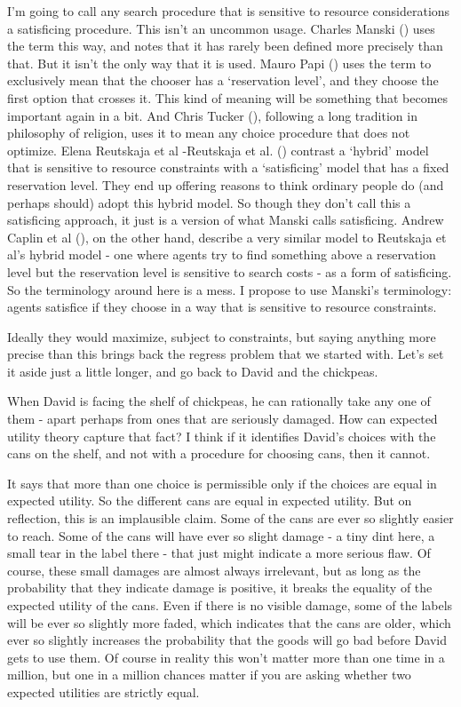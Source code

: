 \documentclass[
  10pt,
  letterpaper,
  DIV=11,
  numbers=noendperiod,
  twoside]{scrartcl}
\begin{document}
I'm going to call any search procedure that is sensitive to resource
considerations a satisficing procedure. This isn't an uncommon usage.
Charles Manski () uses the term this way,
and notes that it has rarely been defined more precisely than that. But
it isn't the only way that it is used. Mauro Papi
() uses the term to exclusively mean that
the chooser has a `reservation level', and they choose the first option
that crosses it. This kind of meaning will be something that becomes
important again in a bit. And Chris Tucker
(), following a long tradition in
philosophy of religion, uses it to mean any choice procedure that does
not optimize. Elena Reutskaja et al -Reutskaja et al.
() contrast a `hybrid' model that is
sensitive to resource constraints with a `satisficing' model that has a
fixed reservation level. They end up offering reasons to think ordinary
people do (and perhaps should) adopt this hybrid model. So though they
don't call this a satisficing approach, it just is a version of what
Manski calls satisficing. Andrew Caplin et al
(), on the other hand, describe a very
similar model to Reutskaja et al's hybrid model - one where agents try
to find something above a reservation level but the reservation level is
sensitive to search costs - as a form of satisficing. So the terminology
around here is a mess. I propose to use Manski's terminology: agents
satisfice if they choose in a way that is sensitive to resource
constraints.

Ideally they would maximize, subject to constraints, but saying anything
more precise than this brings back the regress problem that we started
with. Let's set it aside just a little longer, and go back to David and
the chickpeas.

When David is facing the shelf of chickpeas, he can rationally take any
one of them - apart perhaps from ones that are seriously damaged. How
can expected utility theory capture that fact? I think if it identifies
David's choices with the cans on the shelf, and not with a procedure for
choosing cans, then it cannot.

It says that more than one choice is permissible only if the choices are
equal in expected utility. So the different cans are equal in expected
utility. But on reflection, this is an implausible claim. Some of the
cans are ever so slightly easier to reach. Some of the cans will have
ever so slight damage - a tiny dint here, a small tear in the label
there - that just might indicate a more serious flaw. Of course, these
small damages are almost always irrelevant, but as long as the
probability that they indicate damage is positive, it breaks the
equality of the expected utility of the cans. Even if there is no
visible damage, some of the labels will be ever so slightly more faded,
which indicates that the cans are older, which ever so slightly
increases the probability that the goods will go bad before David gets
to use them. Of course in reality this won't matter more than one time
in a million, but one in a million chances matter if you are asking
whether two expected utilities are strictly equal.
\end{document}
